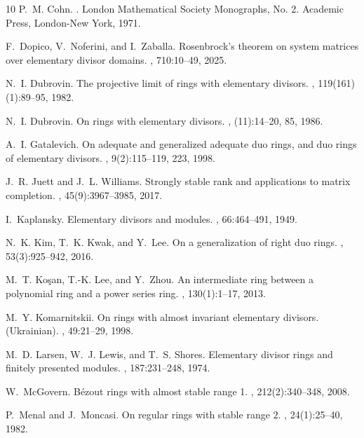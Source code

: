 \documentclass{cimart}
\begin{document}
{\begin{thebibliography}{10}
P.~M. Cohn.
.
\newblock London Mathematical Society Monographs, No. 2. Academic Press,
  London-New York, 1971.

F.~Dopico, V.~Noferini, and I.~Zaballa.
\newblock Rosenbrock's theorem on system matrices over elementary divisor
  domains.
, 710:10--49, 2025.

N.~I. Dubrovin.
\newblock The projective limit of rings with elementary divisors.
, 119(161)(1):89--95, 1982.

N.~I. Dubrovin.
\newblock On rings with elementary divisors.
, (11):14--20, 85, 1986.

A.~I. Gatalevich.
\newblock On adequate and generalized adequate duo rings, and duo rings of
  elementary divisors.
, 9(2):115--119, 223, 1998.

J.~R. Juett and J.~L. Williams.
\newblock Strongly stable rank and applications to matrix completion.
, 45(9):3967--3985, 2017.

I.~Kaplansky.
\newblock Elementary divisors and modules.
, 66:464--491, 1949.

N.~K. Kim, T.~K. Kwak, and Y.~Lee.
\newblock On a generalization of right duo rings.
, 53(3):925--942, 2016.

M.~T. Ko\c{s}an, T.-K. Lee, and Y.~Zhou.
\newblock An intermediate ring between a polynomial ring and a power series
  ring.
, 130(1):1--17, 2013.

M.~Y. Komarnitskii.
\newblock On rings with almost invariant elementary divisors.({U}krainian).
, 49:21--29, 1998.

M.~D. Larsen, W.~J. Lewis, and T.~S. Shores.
\newblock Elementary divisor rings and finitely presented modules.
, 187:231--248, 1974.

W.~McGovern.
\newblock B\'ezout rings with almost stable range 1.
, 212(2):340--348, 2008.

P.~Menal and J.~Moncasi.
\newblock On regular rings with stable range {$2$}.
, 24(1):25--40, 1982.


\end{thebibliography}}
\end{document}
